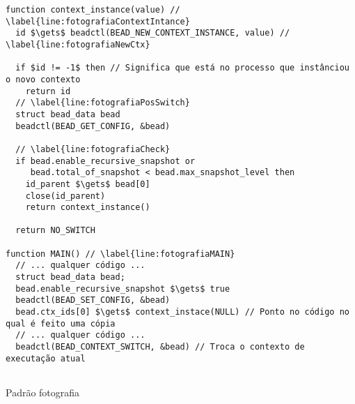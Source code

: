 \begin{pseudocode}
\begin{lstlisting}[language=pseudocode, style=pseudocode]
function context_instance(value) // \label{line:fotografiaContextIntance}
  id $\gets$ beadctl(BEAD_NEW_CONTEXT_INSTANCE, value) // \label{line:fotografiaNewCtx}

  if $id != -1$ then // Significa que está no processo que instânciou o novo contexto
    return id
  // \label{line:fotografiaPosSwitch}
  struct bead_data bead
  beadctl(BEAD_GET_CONFIG, &bead)

  // \label{line:fotografiaCheck}
  if bead.enable_recursive_snapshot or
     bead.total_of_snapshot < bead.max_snapshot_level then
    id_parent $\gets$ bead[0]
    close(id_parent)
    return context_instance()

  return NO_SWITCH

function MAIN() // \label{line:fotografiaMAIN}
  // ... qualquer código ...
  struct bead_data bead;
  bead.enable_recursive_snapshot $\gets$ true
  beadctl(BEAD_SET_CONFIG, &bead)
  bead.ctx_ids[0] $\gets$ context_instace(NULL) // Ponto no código no qual é feito uma cópia
  // ... qualquer código ...
  beadctl(BEAD_CONTEXT_SWITCH, &bead) // Troca o contexto de executação atual
  
\end{lstlisting}

  \label{alg:fotografia}
  \caption{Padrão fotografia}
\end{pseudocode}
